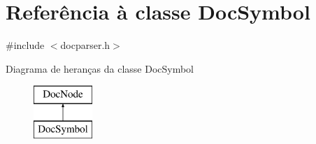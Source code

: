 \hypertarget{class_doc_symbol}{\section{Referência à classe Doc\-Symbol}
\label{class_doc_symbol}
}


{\ttfamily \#include $<$docparser.\-h$>$}

Diagrama de heranças da classe Doc\-Symbol\begin{figure}[H]
\begin{center}
\leavevmode
\includegraphics[height=2.000000cm]{class_doc_symbol}
\end{center}
\end{figure}
